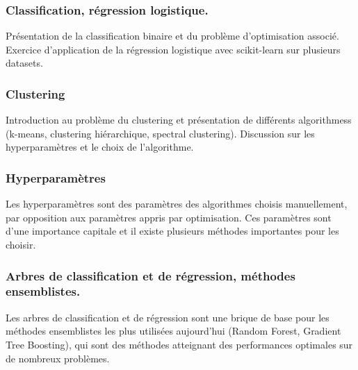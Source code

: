 \documentclass[
10pt, %
a4paper, %
oneside, %
headinclude,footinclude, %
BCOR5mm, %
]{scrartcl}
\begin{document}
\subsubsection{Classification, régression logistique.}%
\label{ssub:}

Présentation de la classification binaire et du problème d'optimisation associé. Exercice d'application de la régression logistique avec  scikit-learn sur plusieurs datasets.

\subsubsection{Clustering}%
\label{ssub:}

Introduction au problème du clustering et présentation de différents  algorithmess  (k-means,  clustering hiérarchique, spectral clustering). Discussion sur les hyperparamètres et le choix de l'algorithme.

\subsubsection{Hyperparamètres}%
\label{ssub:Hyperparamètres}

Les hyperparamètres sont des paramètres des algorithmes choisis manuellement, par opposition aux paramètres appris par optimisation. Ces paramètres sont d'une importance capitale et il existe plusieurs méthodes importantes pour les choisir.

\subsubsection{Arbres de classification et de régression, méthodes ensemblistes.}%
\label{ssub:}

Les arbres de classification et de régression sont une brique de base pour les méthodes ensemblistes les plus utilisées aujourd'hui (Random Forest, Gradient Tree Boosting), qui sont des méthodes atteignant des performances optimales sur de nombreux problèmes.


%
\end{document}
